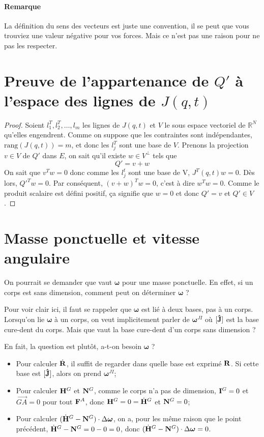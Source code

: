 \documentclass[11pt,a4paper]{article}
\newcommand\fv[1]{{\bf #1}} %
\newcommand\fvd[1]{\dot{\bf #1}} %
\newcommand\uj{{\bf\hat{J}}} %
\newcommand\omegaf{{\bm \omega}}
\newcommand\ine{{\bf I}}
\newcommand\lm{{\bf N}}
\newcommand\am{{\bf H}}
\newcommand\amd{\dot{\am}}
\newcommand\fo{{\bf F}}
\newcommand\xg{\ensuremath{\fv{R}}}
\newcommand\xgd{\ensuremath{\fvd{R}}}
\begin{document}
\paragraph{Remarque}
La définition du sens des vecteurs est juste une convention, il se peut que vous trouviez une valeur négative pour vos forces.
Mais ce n'est pas une raison pour ne pas les respecter.

\appendix
\section{Preuve de l'appartenance de $Q'$ à l'espace des lignes de $J(q, t)$}
\label{ann:orthogonal}
\begin{proof}
Soient $l_1^T, l_2^T, \ldots, l_m$ les lignes de $J(q, t)$ et $V$ le sous espace vectoriel de $\mathbb{R}^N$ qu'elles engendrent.
Comme on suppose que les contraintes sont indépendantes, $\mathrm{rang}(J(q, t)) = m$, et donc les $l_j^T$ sont une base de $V$.
Prenons la projection $v \in V$ de $Q'$ dans $E$, on sait qu'il existe $w \in V^\perp$ tels que
\[ Q' = v + w \]
On sait que $v^Tw = 0$ donc comme les $l_j^t$ sont une base de V, $J^T(q, t)w = 0$.
Dès lors, $Q'^T w = 0$.
Par conséquent, $(v + w)^T w = 0$, c'est à dire $w^T w = 0$.
Comme le produit scalaire est défini positif, ça signifie que $w = 0$ et donc $Q' = v$ et $Q' \in V$.
\end{proof}

\section{Masse ponctuelle et vitesse angulaire}
On pourrait se demander que vaut $\omegaf$ pour une masse ponctuelle.
En effet, si un corps est sans dimension, comment peut on déterminer $\omegaf$ ?

Pour voir clair ici, il faut se rappeler que $\omegaf$ est lié à deux bases, pas à un corps.
Lorsqu'on lie $\omegaf$ à un corps, on veut implicitement parler de $\omegaf^{JI}$ où $[\uj]$ est la base cure-dent du corps.
Mais que vaut la base cure-dent d'un corps sans dimension ?

En fait, la question est plutôt, a-t-on besoin $\omegaf$ ?
\begin{itemize}
	\item Pour calculer $\xgd$,
		il suffit de regarder dans quelle base est exprimé $\xg$.
		Si cette base est $[\uj]$, alors on prend $\omegaf^{JI}$;
	\item Pour calculer $\am^G$ et $\lm^G$, comme le corps n'a pas de dimension, $\ine^G = 0$ et $\vec{GA} = 0$ pour tout $\fo^A$, donc
		$\am^G = 0 = \amd^G$ et $\lm^G = 0$;
	\item Pour calculer $(\amd^G - \lm^G) \cdot \Delta \omegaf$, on a, pour les même raison que le point précédent,
		$\amd^G - \lm^G = 0 - 0 = 0$, donc $(\amd^G - \lm^G) \cdot \Delta \omegaf = 0$.
\end{itemize}
\end{document}
